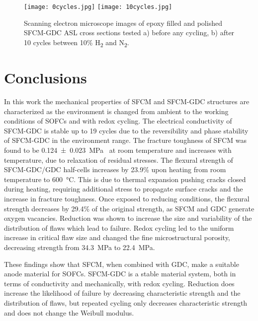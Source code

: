        \begin{figure}
          \texttt{[image: 0cycles.jpg]}
          \texttt{[image: 10cycles.jpg]}
          \caption{Scanning electron microscope images of epoxy filled and polished SFCM-GDC ASL  cross sections tested a) before any cycling, b) after 10 cycles between 10\% H\textsubscript{2} and N\textsubscript{2}.}
          \label{fig:cycledSEM}
        \end{figure}

\section{Conclusions}
    In this work the mechanical properties of SFCM and SFCM-GDC structures are characterized as the environment is changed from ambient to the working conditions of SOFCs and with redox cycling.
    The electrical conductivity of SFCM-GDC is stable up to 19 cycles due to the reversibility and phase stability of SFCM-GDC in the environment range.
    The fracture toughness of SFCM was found to be \SI[separate-uncertainty = true]{0.124 +- 0.023}{\mega\pascal{}} at room temperature and increases with temperature, due to relaxation of residual stresses.
    The flexural strength of SFCM-GDC/GDC half-cells increases by 23.9\% upon heating from room temperature to \SI{600}{\celsius}.
    This is due to thermal expansion pushing cracks closed during heating, requiring additional stress to propagate surface cracks and the increase in fracture toughness.
    Once exposed to reducing conditions, the flexural strength decreases by 29.4\% of the original strength, as SFCM and GDC generate oxygen vacancies.
    Reduction was shown to increase the size and variability of the distribution of flaws which lead to failure.
    Redox cycling led to the uniform increase in critical flaw size and changed the fine microstructural porosity, decreasing strength from \SI{34.3}{\mega\pascal} to \SI{22.4}{\mega\pascal}.

    These findings show that SFCM, when combined with GDC, make a suitable anode material for SOFCs.
    SFCM-GDC is a stable material system, both in terms of conductivity and mechanically, with redox cycling.
    Reduction does increase the likelihood of failure by decreasing characteristic strength and the distribution of flaws, but repeated cycling only decreases characteristic strength and does not change the Weibull modulus.
